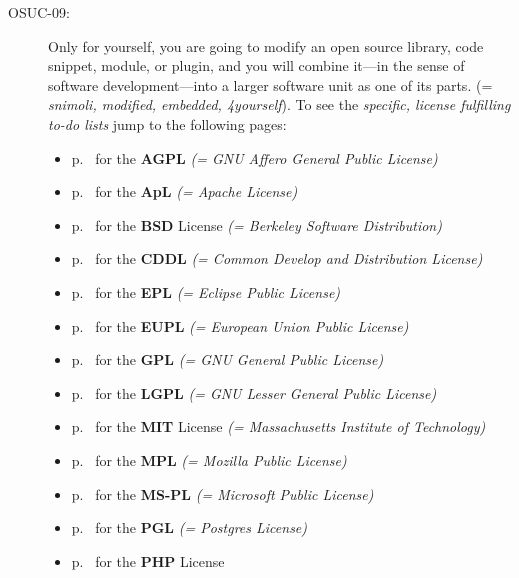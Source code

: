 \begin{description}
\item[OSUC-09:]\label{OSUC-09-DEF} Only for yourself, you are going to modify an
open source library, code snippet, module, or plugin, and you will combine it---in 
the sense of software development---into a larger software unit as one of
its parts. (= \textit{snimoli, modified, embedded, 4yourself}). 
To see the \textit{specific, license fulfilling to-do lists} jump to the
following pages:
  \begin{itemize}
    \item p.\ \pageref{OSUC-09-AGPL} for the \textbf{AGPL}
      \textit{(= GNU Affero General Public License)} 
    \item p.\ \pageref{OSUC-09-Apache20} for the \textbf{ApL}
      \textit{(= Apache License)}
    \item p.\ \pageref{OSUC-09-BSD} for the \textbf{BSD} License
      \textit{(= Berkeley Software Distribution)}
    \item p.\ \pageref{OSUC-09-CDDL} for the \textbf{CDDL}
      \textit{(= Common Develop and Distribution License)}  
    \item p.\ \pageref{OSUC-09-EPL} for the \textbf{EPL}
      \textit{(= Eclipse Public License)}     
    \item p.\ \pageref{OSUC-09-EUPL} for the \textbf{EUPL}
      \textit{(= European Union Public License)} 
    \item p.\ \pageref{OSUC-09-GPL} for the \textbf{GPL}
       \textit{(= GNU General Public License)} 
    \item p.\ \pageref{OSUC-09-LGPL} for the \textbf{LGPL}
      \textit{(= GNU Lesser General Public License)}           
    \item p.\ \pageref{OSUC-09-MIT} for the \textbf{MIT} License
       \textit{(= Massachusetts Institute of Technology)} 
    \item p.\ \pageref{OSUC-09-MPL} for the \textbf{MPL}
      \textit{(= Mozilla Public License)}     
    \item p.\ \pageref{OSUC-09-MS-PL} for the \textbf{MS-PL}
      \textit{(= Microsoft Public License)} 
    \item p.\ \pageref{OSUC-09-PGL} for the \textbf{PGL}
      \textit{(= Postgres License)} 
    \item p.\ \pageref{OSUC-09-PHP} for the \textbf{PHP} License 
  \end{itemize}



\end{description}
